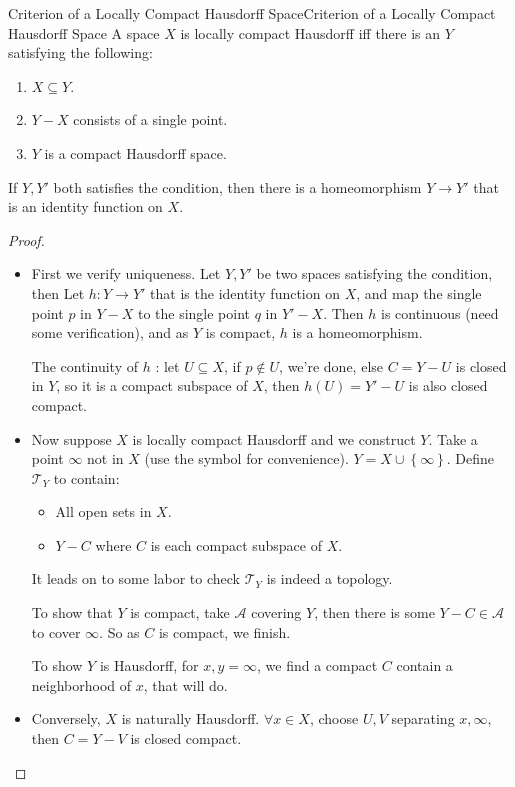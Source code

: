 \documentclass[../main.tex]{subfiles}
\begin{document}
\begin{theorem}{Criterion of a Locally Compact Hausdorff Space}{Criterion of a Locally Compact Hausdorff Space}
	A space $X$ is locally compact Hausdorff iff there is an $Y$ satisfying the following:
	\begin{enumerate}
		\item $X \subseteq Y$.
		\item $Y-X$ consists of a single point.
		\item $Y$ is a compact Hausdorff space.
	\end{enumerate}

	If $Y,Y'$ both satisfies the condition, then there is a homeomorphism $Y \rightarrow Y'$ that is an identity function on $X$.
\end{theorem}
\begin{proof}
\begin{itemize}
\item First we verify uniqueness. Let $Y,Y'$ be two spaces satisfying the condition, then Let $h:Y \rightarrow Y'$ that is the identity function on $X$, and map the single point $p$ in $Y-X$ to the single point $q$ in $Y'-X$. Then $h$ is continuous (need some verification), and as $Y$ is compact, $h$ is a homeomorphism.

	The continuity of $h$ : let $U \subseteq X$, if $p\notin U$, we're done, else $C=Y-U$ is closed in $Y$, so it is a compact subspace of $X$, then $h(U) = Y'-U$ is also closed compact.
\item Now suppose $X$ is locally compact Hausdorff and we construct $Y$. Take a point $\infty $ not in $X$ (use the symbol for convenience). $Y = X \cup \left\{ \infty  \right\}$. Define $\mathcal{T}_Y$ to contain:
	\begin{itemize}
	\item All open sets in $X$.
	\item $Y-C$ where $C$ is each compact subspace of $X$.
	\end{itemize}
It leads on to some labor to check $\mathcal{T}_Y$ is indeed a topology.

To show that $Y$ is compact, take $\mathcal{A}$ covering $Y$, then there is some $Y-C\in \mathcal{A}$ to cover $\infty $. So as $C$ is compact, we finish.

To show $Y$ is Hausdorff, for $x,y=\infty $, we find a compact $C$ contain a neighborhood of $x$, that will do.
\item Conversely, $X$ is naturally Hausdorff. $\forall x\in X$, choose $U,V$ separating $x,\infty $, then $C=Y-V$ is closed compact.
\end{itemize}
\end{proof}
\end{document}

